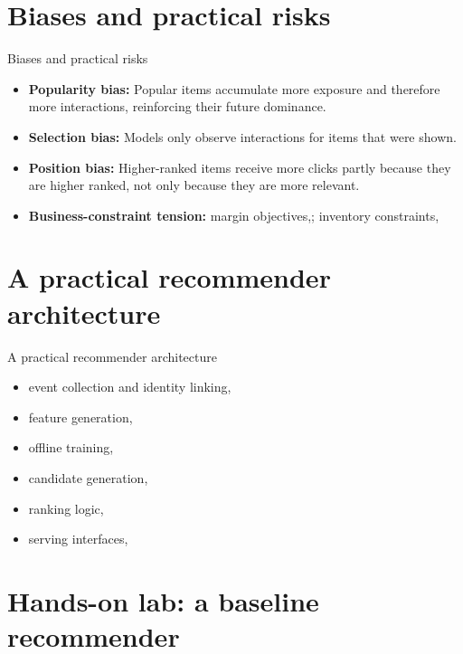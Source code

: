\documentclass[aspectratio=169]{beamer}
\begin{document}
\section{Biases and practical risks}

\begin{frame}{Biases and practical risks}
  \begin{itemize}
    \item \textbf{Popularity bias:} Popular items accumulate more exposure and therefore more interactions, reinforcing their future dominance.
    \item \textbf{Selection bias:} Models only observe interactions for items that were shown.
    \item \textbf{Position bias:} Higher-ranked items receive more clicks partly because they are higher ranked, not only because they are more relevant.
    \item \textbf{Business-constraint tension:} margin objectives,; inventory constraints,
  \end{itemize}
\end{frame}

\section{A practical recommender architecture}

\begin{frame}{A practical recommender architecture}
  \begin{itemize}
    \item event collection and identity linking,
    \item feature generation,
    \item offline training,
    \item candidate generation,
    \item ranking logic,
    \item serving interfaces,
  \end{itemize}
\end{frame}

\section{Hands-on lab: a baseline recommender}
\end{document}
